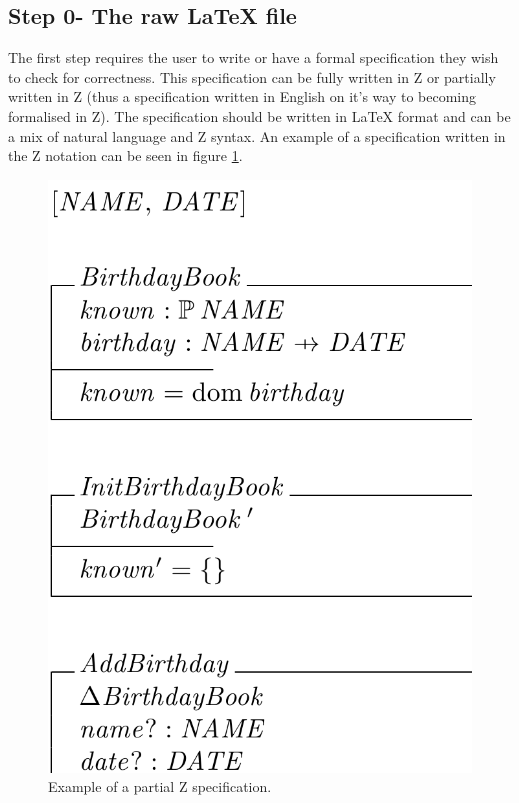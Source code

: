 \subsection{Step 0- The raw LaTeX file}

The first step requires the user to write or have a formal specification they
wish to check for correctness. This specification can be fully written in Z or
partially written in Z (thus a specification written in English on it's way to
becoming formalised in Z). The specification should be written in \LaTeX{}
format and can be a mix of natural language and Z syntax. An example of a
specification written in the Z notation can be seen in figure
\ref{fig:zexample}.

\begin{figure}[H]
 \begin{center}
 \includegraphics[scale=0.25]{Figures/Design/zspec.png}
 \caption{Example of a partial Z specification.}
 \label{fig:zexample}
\end{center}
\end{figure} 

